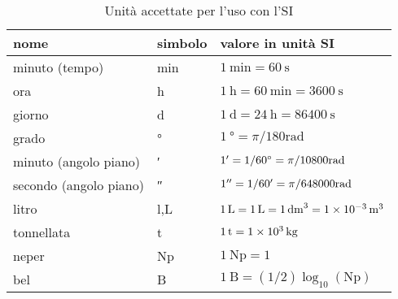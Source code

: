 \begin{table}[ht]
  \centering
  \begin{tabular}{lll}
    \toprule
    nome                   & simbolo                 & valore in unità SI                                                                       \\
    \midrule
    minuto (tempo)         & \si{\minute}            & $\SI{1}{\minute} = \SI{60}{\second}$                                                     \\
    ora                    & \si{\hour}              & $\SI{1}{\hour}=\SI{60}{\minute}=\SI{3600}{\second}$                                      \\
    giorno                 & \si{\day}               & $\SI{1}{\day}=\SI{24}{\hour}=\SI{86400}{\second}$                                        \\
    grado                  & \si{\degree}            & $\SI{1}{\degree}=\pi/180\si{\radian}$                                                    \\
    minuto (angolo piano)  & \si{\arcminute}         & $\SI{1}{\arcminute}=\SI[parse-numbers = false]{1/60}{\degree}=\pi/10800\si{\radian}$     \\
    secondo (angolo piano) & \si{\arcsecond}         & $\SI{1}{\arcsecond}=\SI[parse-numbers = false]{1/60}{\arcminute}=\pi/648000\si{\radian}$ \\
    litro                  & \si{\litre},\si{\liter} & $\SI{1}{\litre}=\SI{1}{\liter}=\SI{1}{\deci\meter\cubed}=\SI{1E-3}{\meter\cubed}$        \\
    tonnellata             & \si{\tonne}             & $\SI{1}{\tonne}=\SI{1E3}{\kilogram}$                                                     \\
    neper                  & \si{\neper}             & $\SI{1}{\neper}=1$                                                                       \\
    bel                    & \si{\bel}               & $\SI{1}{\bel}=(1/2)\log_{10}(\si{\neper})$                                               \\
    \bottomrule
  \end{tabular}
  \caption{Unità accettate per l'uso con l'SI}
\end{table}

